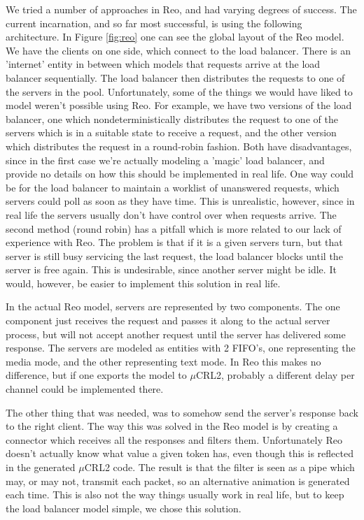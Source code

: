 \documentclass[a4paper]{article}
\newcommand{\re}{Reo\xspace}
\newcommand{\mcrl}{$\mu$CRL2\xspace}
\begin{document}
We tried a number of approaches in \re, and had varying degrees of success. The
current incarnation, and so far most successful, is using the following
architecture. In Figure \ref{fig:reo} one can see the global layout of the \re
model. We have the clients on one side, which connect to the load balancer.
There is an 'internet' entity in between which models that requests arrive at
the load balancer sequentially. The load balancer then distributes the requests
to one of the servers in the pool. Unfortunately, some of the things we would
have liked to model weren't possible using \re. For example, we have two
versions of the load balancer, one which nondeterministically distributes the
request to one of the servers which is in a suitable state to receive a request,
and the other version which distributes the request in a round-robin fashion.
Both have disadvantages, since in the first case we're actually modeling a
'magic' load balancer, and provide no details on how this should be implemented
in real life. One way could be for the load balancer to maintain a worklist of
unanswered requests, which servers could poll as soon as they have time. This is
unrealistic, however, since in real life the servers usually don't have control
over when requests arrive. The second method (round robin) has a pitfall which
is more related to our lack of experience with \re. The problem is that if it is a
given servers turn, but that server is still busy servicing the last request,
the load balancer blocks until the server is free again. This is undesirable,
since another server might be idle. It would, however, be easier to implement
this solution in real life.

In the actual \re model, servers are represented by two components. The one
component just receives the request and passes it along to the actual server
process, but will not accept another request until the server has delivered some
response. The servers are modeled as entities with 2 FIFO's, one representing
the media mode, and the other representing text mode. In \re this makes no
difference, but if one exports the model to \mcrl, probably a different delay
per channel could be
implemented there.

The other thing that was needed, was to somehow send the server's response back
to the right client. The way this was solved in the \re model is by creating a
connector which receives all the responses and filters them. Unfortunately \re
doesn't actually know what value a given token has, even though this is
reflected in the generated \mcrl code. The result is that the filter is seen as
a pipe which may, or may not, transmit each packet, so an alternative animation
is generated each time. This is also not the way things usually work in real
life, but to keep the load balancer model simple, we chose this solution.
\end{document}
